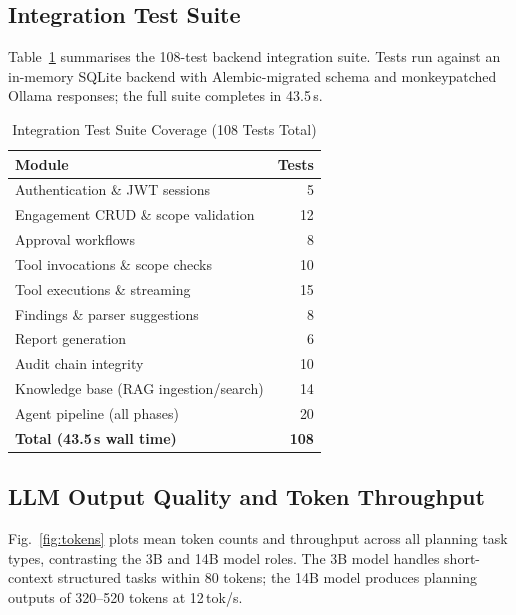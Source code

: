 \documentclass[conference]{IEEEtran}
\begin{document}
\subsection{Integration Test Suite}

Table~\ref{tab:tests} summarises the 108-test backend integration suite.
Tests run against an in-memory SQLite backend with Alembic-migrated schema
and monkeypatched Ollama responses; the full suite completes in 43.5\,s.

\begin{table}[t]
\caption{Integration Test Suite Coverage (108 Tests Total)}
\centering\small
\begin{tabular}{lr}
\toprule
Module & Tests\\
\midrule
Authentication \& JWT sessions         & 5\\
Engagement CRUD \& scope validation    & 12\\
Approval workflows                     & 8\\
Tool invocations \& scope checks       & 10\\
Tool executions \& streaming           & 15\\
Findings \& parser suggestions         & 8\\
Report generation                      & 6\\
Audit chain integrity                  & 10\\
Knowledge base (RAG ingestion/search)  & 14\\
Agent pipeline (all phases)            & 20\\
\midrule
\textbf{Total (43.5\,s wall time)}     & \textbf{108}\\
\bottomrule
\end{tabular}
\label{tab:tests}
\end{table}

\subsection{LLM Output Quality and Token Throughput}

Fig.~\ref{fig:tokens} plots mean token counts and throughput
across all planning task types, contrasting the 3B and 14B model roles.
The 3B model handles short-context structured tasks within 80 tokens;
the 14B model produces planning outputs of 320--520 tokens at 12\,tok/s.
\end{document}
